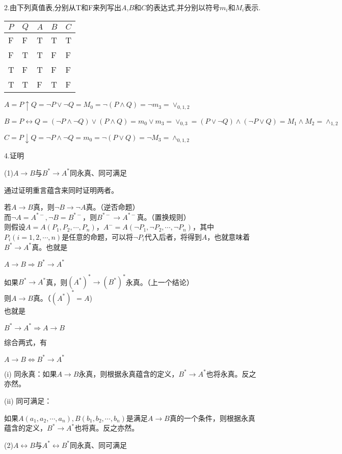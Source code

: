 \documentclass[
]{article}
\author{}
\date{}
\begin{document}
2.由下列真值表,分别从T和F来列写出\(A\),\(B\)和\(C\)的表达式,并分别以符号\(m_i\)和\(M_i\)表示.

\begin{longtable}[]{@{}lllll@{}}
\toprule
\(P\) & \(Q\) & \(A\) & \(B\) & \(C\)\tabularnewline
\midrule
\endhead
F & F & T & T & T\tabularnewline
F & T & T & F & F\tabularnewline
T & F & T & F & F\tabularnewline
T & T & F & T & F\tabularnewline
\bottomrule
\end{longtable}

\(A=P\uparrow Q=\neg P \vee \neg Q=M_0=\neg(P\wedge Q)=\neg m_3=\vee_{0,1,2}\)

\(B=P\leftrightarrow Q=(\neg P \wedge \neg Q)\vee (P \wedge Q)=m_0\vee m_3=\vee_{0,3}=(P \vee \neg Q)\wedge (\neg P\vee Q)=M_1\wedge M_2=\wedge_{1,2}\)

\(C=P\downarrow Q=\neg P\wedge \neg Q=m_0=\neg (P\vee Q)=\neg M_3=\wedge_{0,1,2}\)

4.证明

(1)\(A→B\)与\(B^*→A^*\)同永真、同可满足

通过证明重言蕴含来同时证明两者。

若\(A\rightarrow B\)真，则\(\neg B\rightarrow \neg A\)真。（逆否命题）\\
而\(\neg A=A^{*-},\neg B=B^{*-}\)，则\(B^{*-}\rightarrow A^{*-}\)真。（置换规则）\\
则假设\(A=A(P_1,P_2,\cdots,P_n)\)，\(A^-=A(\neg P_1,\neg P_2,\cdots,\neg P_n)\)，其中\(P_i(i=1,2,\cdots,n)\)是任意的命题，可以将\(\neg P_i\)代入后者，将得到\(A\)，也就意味着\(B^*\rightarrow A^*\)真。也就是

\(A\rightarrow B\Rightarrow B^*\rightarrow A^*\)

如果\(B^*\rightarrow A^*\)真，则\((A^*)^*\rightarrow (B^*)^*\)永真。（上一个结论）\\
则\(A\rightarrow B\)真。（\((A^*)^*=A\))\\
也就是

\(B^*\rightarrow A^* \Rightarrow A\rightarrow B\)

综合两式，有

\(A\rightarrow B\Leftrightarrow B^*\rightarrow A^*\)

(i)
同永真：如果\(A→B\)永真，则根据永真蕴含的定义，\(B^*→A^*\)也将永真。反之亦然。

(ii) 同可满足：

如果\(A(a_1,a_2,\cdots,a_n),B(b_1,b_2,\cdots,b_n)\)是满足\(A→B\)真的一个条件，则根据永真蕴含的定义，\(B^*→A^*\)也将真。反之亦然。

(2)\(A\leftrightarrow B\)与\(A^*\leftrightarrow B^*\)同永真、同可满足
\end{document}
